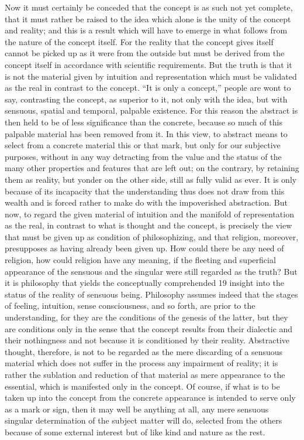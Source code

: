 Now it must certainly be conceded that the concept is as such not yet
complete, that it must rather be raised to the idea which alone is the unity
of the concept and reality; and this is a result which will have to emerge
in what follows from the nature of the concept itself.
For the reality that
the concept gives itself cannot be picked up as it were from the outside
but must be derived from the concept itself in accordance with scientific
requirements. But the truth is that it is not the material given by intuition
and representation which must be validated as the real in contrast to the
concept. “It is only a concept,” people are wont to say, contrasting the
concept, as superior to it, not only with the idea, but with sensuous, spatial
and temporal, palpable existence. For this reason the abstract is then held to
be of less significance than the concrete, because so much of this palpable
material has been removed from it. In this view, to abstract means to
select from a concrete material this or that mark, but only for our subjective
purposes, without in any way detracting from the value and the status of
the many other properties and features that are left out; on the contrary,
by retaining them as reality, but yonder on the other side, still as fully
valid as ever. It is only because of its incapacity that the understanding
thus does not draw from this wealth and is forced rather to make do with
the impoverished abstraction. But now, to regard the given material of
intuition and the manifold of representation as the real, in contrast to what
is thought and the concept, is precisely the view that must be given up as
condition of philosophizing, and that religion, moreover, presupposes as
having already been given up. How could there be any need of religion, how
could religion have any meaning, if the fleeting and superficial appearance
of the sensuous and the singular were still regarded as the truth? But it
is philosophy that yields the conceptually comprehended 19 insight into the
status of the reality of sensuous being. Philosophy assumes indeed that the
stages of feeling, intuition, sense consciousness, and so forth, are prior to
the understanding, for they are the conditions of the genesis of the latter,
but they are conditions only in the sense that the concept results from
their dialectic and their nothingness and not because it is conditioned by
their reality. Abstractive thought, therefore, is not to be regarded as the
mere discarding of a sensuous material which does not suffer in the process
any impairment of reality; it is rather the sublation and reduction of that
material as mere appearance to the essential, which is manifested only in
the concept. Of course, if what is to be taken up into the concept from the
concrete appearance is intended to serve only as a mark or sign, then it may
well be anything at all, any mere sensuous singular determination of the
subject matter will do, selected from the others because of some external
interest but of like kind and nature as the rest.

